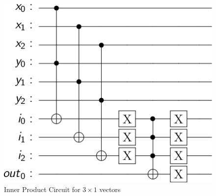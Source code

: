 \documentclass[10pt]{proc}
\theoremstyle{definition}
\theoremstyle{remark}
\begin{document}
\begin{figure}[!ht]
  \centering
  \includegraphics[scale=0.4]{results/inner_product_3x1.png} 
  \caption{Inner Product Circuit for $3 \times 1$ vectors}
  \label{fig:inner_product_circuit_3x1}
\end{figure}
\end{document}
